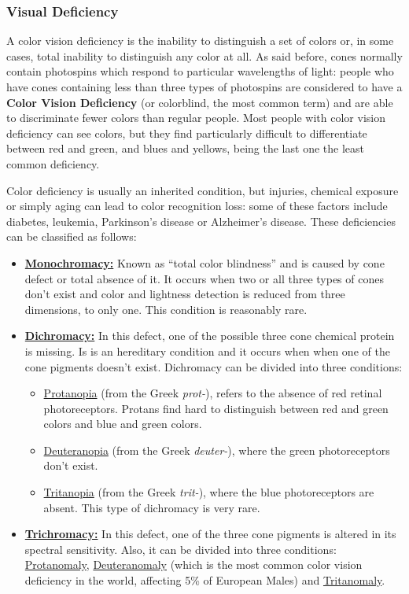 \subsubsection{Visual Deficiency}
A color vision deficiency is the inability to distinguish a set of colors or, in some cases, total
inability to distinguish any color at all. As said before, cones normally contain photospins which respond
to particular wavelengths of light: people who have cones containing less than three types of photospins are considered to have a \textbf{Color Vision Deficiency} (or colorblind, the most common term)
and are able to discriminate fewer colors than regular people. Most people with color vision deficiency can
see colors, but they find particularly difficult to differentiate between red and green, and blues and
yellows, being the last one the least common deficiency. \par
Color deficiency is usually an inherited condition, but injuries, chemical exposure or simply aging can lead to color
recognition loss: some of these factors include diabetes, leukemia, Parkinson’s disease or Alzheimer’s
disease. These deficiencies can be classified as follows:
%
\begin{itemize}
\item \textbf{\underline{Monochromacy:}} Known as “total color blindness” and is caused by cone defect or
total absence of it. It occurs when two or all three types of cones don’t exist and color and lightness
detection is reduced from three dimensions, to only one. This condition is reasonably rare.
\item \textbf{\underline{Dichromacy:}} In this defect, one of the possible three cone chemical protein is
missing. Is is an hereditary condition and it occurs when when one of the cone pigments doesn’t exist.
Dichromacy can be divided into three conditions:
	\begin{itemize}
	\item \underline{Protanopia} (from the Greek \emph{prot-}), refers to the absence of red retinal
    photoreceptors.
    Protans find hard to distinguish between red and green colors and blue and green colors.
    \item \underline{Deuteranopia} (from the Greek \emph{deuter-}), where the green photoreceptors don’t
    exist.
    \item \underline{Tritanopia} (from the Greek \emph{trit-}), where the blue photoreceptors are absent.
    This type of dichromacy is very rare.
	\end{itemize}
\item \textbf{\underline{Trichromacy:}} In this defect, one of the three cone pigments is altered in its
spectral sensitivity. Also, it can be divided into three conditions: \underline{Protanomaly}, \underline{Deuteranomaly} (which is the most common color vision deficiency in the world, affecting 5\% of European Males) and \underline{Tritanomaly}.
\end{itemize} \par
